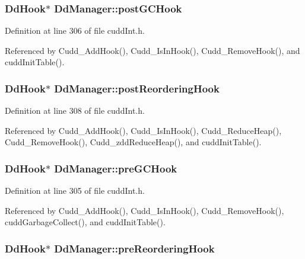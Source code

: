 \subsubsection{\setlength{\rightskip}{0pt plus 5cm}\bf{Dd\-Hook}$\ast$ \bf{Dd\-Manager::post\-GCHook}}\label{structDdManager_1aaf2a374903e2cc91c65730d0cfc2e1}




Definition at line 306 of file cudd\-Int.h.

Referenced by Cudd\_\-Add\-Hook(), Cudd\_\-Is\-In\-Hook(), Cudd\_\-Remove\-Hook(), and cudd\-Init\-Table().
\subsubsection{\setlength{\rightskip}{0pt plus 5cm}\bf{Dd\-Hook}$\ast$ \bf{Dd\-Manager::post\-Reordering\-Hook}}\label{structDdManager_051721a550ae2f41b9838b8153d46b30}




Definition at line 308 of file cudd\-Int.h.

Referenced by Cudd\_\-Add\-Hook(), Cudd\_\-Is\-In\-Hook(), Cudd\_\-Reduce\-Heap(), Cudd\_\-Remove\-Hook(), Cudd\_\-zdd\-Reduce\-Heap(), and cudd\-Init\-Table().
\subsubsection{\setlength{\rightskip}{0pt plus 5cm}\bf{Dd\-Hook}$\ast$ \bf{Dd\-Manager::pre\-GCHook}}\label{structDdManager_6e7664b46763e45c7388778e6e786a0e}




Definition at line 305 of file cudd\-Int.h.

Referenced by Cudd\_\-Add\-Hook(), Cudd\_\-Is\-In\-Hook(), Cudd\_\-Remove\-Hook(), cudd\-Garbage\-Collect(), and cudd\-Init\-Table().
\subsubsection{\setlength{\rightskip}{0pt plus 5cm}\bf{Dd\-Hook}$\ast$ \bf{Dd\-Manager::pre\-Reordering\-Hook}}\label{structDdManager_227987a65d97bf4b8f3c905d6cc79024}




